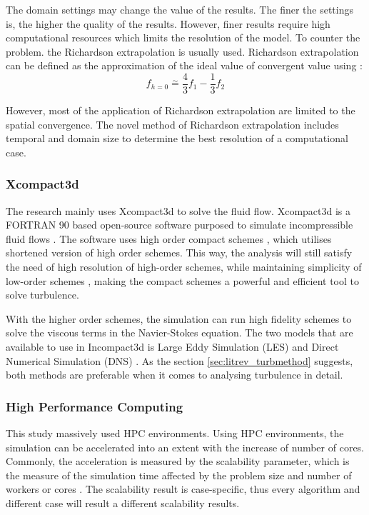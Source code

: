 The domain settings may change the value of the results. The finer the settings is, the higher the quality of the results. However, finer results require high computational resources which limits the resolution of the model. To counter the problem. the Richardson extrapolation is usually used. Richardson extrapolation can be defined as the approximation of the ideal value of convergent value using \cite{roache2009verification}:
\begin{equation}
	f_{h=0} \stackrel{\sim}{=} \frac43 f_1 - \frac13 f_2
\end{equation}

However, most of the application of Richardson extrapolation are limited to the spatial convergence. The novel method of Richardson extrapolation includes temporal and domain size to determine the best resolution of a computational case.

\subsubsection{Xcompact3d}
\label{sec:litrev_ic3d}
The research mainly uses Xcompact3d to solve the fluid flow. Xcompact3d is a FORTRAN 90 based open-source software purposed to simulate incompressible fluid flows \cite{Bartholomew2020}. The software uses high order compact schemes \cite{Laizet2014}, which utilises shortened version of high order schemes. This way, the analysis will still satisfy the need of high resolution of high-order schemes, while maintaining simplicity of low-order schemes \cite{Laizet2009}, making the compact schemes a powerful and efficient tool to solve turbulence.


With the higher order schemes, the simulation can run high fidelity schemes to solve the viscous terms in the Navier-Stokes equation. The two models that are available to use in Incompact3d is Large Eddy Simulation (LES) and Direct Numerical Simulation (DNS) \cite{Laizet2014}. As the section \ref{sec:litrev_turbmethod} suggests, both methods are preferable when it comes to analysing turbulence in detail.


\subsubsection{High Performance Computing}
This study massively used HPC environments. Using HPC environments, the simulation can be accelerated into an extent with the increase of number of cores. Commonly, the acceleration is measured by the scalability parameter, which is the measure of the simulation time affected by the problem size and number of workers or cores \cite{Cornell2024}. The scalability result is case-specific, thus every algorithm and different case will result a different scalability results. 

